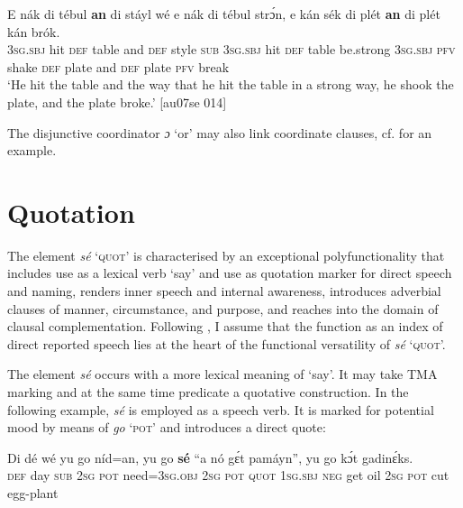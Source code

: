 \ea%
    \label{ex:key:1365}
    \gll E    nák  di  tébul  \textbf{an}  di  stáyl  wé  e    nák  di  tébul  strɔ́n,
e    kán  sék    di  plét    \textbf{an}  di  plét    kán  brók.\\
\textsc{3sg.sbj}  hit  \textsc{def}  table  and  \textsc{def}  style  \textsc{sub}  \textsc{3sg.sbj}  hit  \textsc{def}  table  be.strong
\textsc{3sg.sbj}  \textsc{pfv}  shake  \textsc{def}  plate  and  \textsc{def}  plate  \textsc{pfv}  break\\

\glt ‘He hit the table and the way that he hit the table in a strong way, 
he shook the plate, and the plate broke.’ [au07se 014]
\z

The disjunctive coordinator \textit{ɔ} ‘or’ may also link coordinate clauses, cf.  for an example.

\section{Quotation}\label{sec:10.4}

The element \textit{sé} ‘\textsc{quot}’ is characterised by an exceptional polyfunctionality that includes use as a lexical verb ‘say’ and use as quotation marker for direct speech and naming, renders inner speech and internal awareness, introduces adverbial clauses of manner, circumstance, and purpose, and reaches into the domain of clausal complementation. Following \citet{Güldemann2008}, I assume that the function as an index of direct reported speech lies at the heart of the functional versatility of \textit{sé} ‘\textsc{quot}’. 


The element \textit{sé} occurs with a more lexical meaning of ‘say’. It may take \textsc{TMA} marking and at the same time predicate a quotative construction. In the following example, \textit{sé} is employed as a speech verb. It is marked for potential mood by means of \textit{go} ‘\textsc{pot}’ and introduces a direct quote: 



\ea%
    \label{ex:key:1366}
    \gll Di  dé  wé  yu  go  níd=an,    yu  go  \textbf{sé}    “a    nó  gɛ́t  pamáyn”,
yu  go  kɔ́t  gadinɛ́ks.\\
\textsc{def}  day  \textsc{sub}  \textsc{2sg}  \textsc{pot}  need=\textsc{3sg.obj}  \textsc{2sg}  \textsc{pot}  \textsc{quot}    \textsc{1sg.sbj}  \textsc{neg}  get  oil
\textsc{2sg}  \textsc{pot}  cut  egg-plant\\

